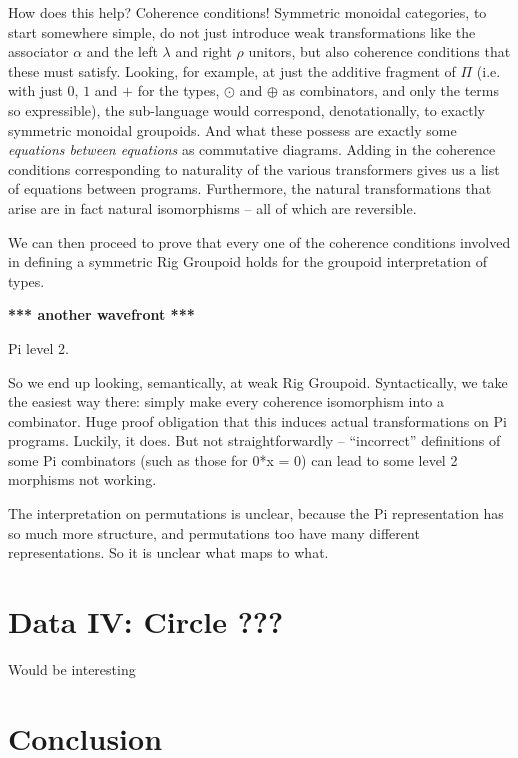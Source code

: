 \documentclass{article}
\newcommand{\amr}[1]{\fbox{Amr says:} \textbf{#1}}
\begin{document}
How does this help? Coherence conditions! Symmetric monoidal categories,
to start somewhere simple, do not just introduce weak transformations
like the associator $\alpha$ and the left $\lambda$ and right $\rho$
unitors, but also coherence conditions that these must satisfy. Looking,
for example, at just the additive fragment of $\Pi$ (i.e. with just $0$,
$1$ and $+$ for the types, $\odot$ and $\oplus$ as combinators, and
only the terms so expressible), the sub-language would correspond,
denotationally, to exactly symmetric monoidal groupoids. And what
these possess are exactly some \emph{equations between equations}
as commutative diagrams.  Adding in the coherence conditions 
corresponding to naturality of the various transformers gives us a
list of equations between programs.  Furthermore, the natural transformations
that arise are in fact natural isomorphisms -- all of which are
reversible.

We can then proceed to prove that every one of the coherence conditions
involved in defining a symmetric Rig Groupoid holds for the groupoid
interpretation of types.

\amr{*** another wavefront ***}

Pi level 2.

So we end up looking, semantically, at weak Rig Groupoid. Syntactically,
we take the easiest way there: simply make every coherence isomorphism into
a combinator. Huge proof obligation that this induces actual transformations
on Pi programs. Luckily, it does.  But not straightforwardly -- ``incorrect''
definitions of some Pi combinators (such as those for 0*x = 0) can lead to
some level 2 morphisms not working.

The interpretation on permutations is unclear, because the Pi representation
has so much more structure, and permutations too have many different
representations. So it is unclear what maps to what.

\section{Data IV: Circle ???}

Would be interesting

\section{Conclusion}
\end{document}

